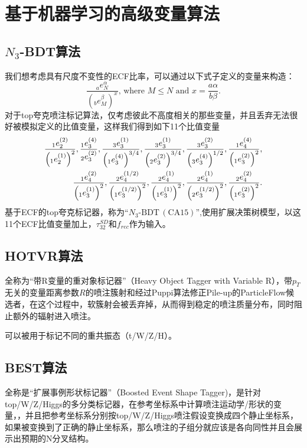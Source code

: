 \section{基于机器学习的高级变量算法}
\subsection{$N_3$-BDT算法}
我们想考虑具有尺度不变性的ECF比率，可以通过以下式子定义的变量来构造：
\begin{equation}
    \frac{{}_{a}e_{N}^{\alpha}}{(_{b}e_{M}^{\beta})^{x}}\text{, where }M\leq N%
\text{ and }x=\frac{a\alpha}{b\beta}.
\end{equation}
对于top夸克喷注标记算法，仅考虑彼此不高度相关的那些变量，并且丢弃无法很好被模拟定义的比值变量，这样我们得到如下11个比值变量
\begin{equation}
\begin{split}
\displaystyle\frac{{}_{1}e_{2}^{(2)}}{\Bigl{(}{}_{1}e_{2}^{(1)}\Bigr{)}^{2}},%
\frac{{}_{1}e_{3}^{(4)}}{{}_{2}e_{3}^{(2)}},\frac{{}_{3}e_{3}^{(1)}}{\Bigl{(}{%
}_{1}e_{3}^{(4)}\Bigr{)}^{3/4}},\displaystyle\frac{{}_{3}e_{3}^{(1)}}{\Bigl{(}{}_{2}e_{3}^{(2)}\Bigr{)}^{3/4}}%
,\frac{{}_{3}e_{3}^{(2)}}{\Bigl{(}{}_{3}e_{3}^{(4)}\Bigr{)}^{1/2}},
\displaystyle\frac{{}_{1}e_{4}^{(4)}}{\Bigl{(}{}_{1}e_{3}^{(2)}\Bigr{)}^{2}},\\
\frac{{}_{1}e_{4}^{(2)}}{\Bigl{(}{}_{1}e_{3}^{(1)}\Bigr{)}^{2}},\frac{{}_{2}e_%
{4}^{(1/2)}}{\Bigl{(}{}_{1}e_{3}^{(1/2)}\Bigr{)}^{2}},\displaystyle\frac{{}_{2}e_{4}^{(1)}}{\Bigl{(}{}_{1}e_{3}^{(1)}\Bigr{)}^{2}},%
\frac{{}_{2}e_{4}^{(1)}}{\Bigl{(}{}_{2}e_{3}^{(1/2)}\Bigr{)}^{2}},\frac{{}_{2}%
e_{4}^{(2)}}{\Bigl{(}{}_{1}e_{3}^{(2)}\Bigr{)}^{2}}.
\end{split}
\end{equation}
基于ECF的top夸克标记器，称为“$N_{3}\text{-}\mathrm{BDT}\,(\mathrm{CA}15)$”,使用扩展决策树模型，以这11个ECF比值变量加上，$\tau^{SD}_{32}\text{和}f_{rec}$作为输入。
\subsection{HOTVR算法}
全称为“带R变量的重对象标记器”（Heavy Object Tagger with Variable R），带$p_T$无关的变量距离参数$R$的喷注簇射和经过Puppi算法修正Pile-up的ParticleFlow候选者，在这个过程中，软簇射会被丢弃掉，从而得到稳定的喷注质量分布，同时阻止额外的辐射进入喷注。

可以被用于标记不同的重共振态（t/W/Z/H）。
\subsection{BEST算法}
全称是“扩展事例形状标记器”（Boosted Event Shape Tagger)，是针对top/W/Z/Higgs的多分类标记器，在参考坐标系中计算喷注运动学/形状的变量，，并且把参考坐标系分别按top/W/Z/Higgs喷注假设变换成四个静止坐标系，如果被变换到了正确的静止坐标系，那么喷注的子组分就应该是各向同性并且会展示出预期的N分叉结构。

